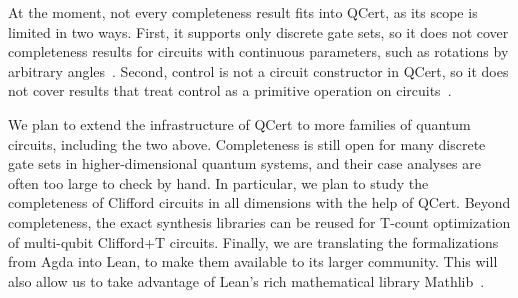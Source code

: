 \documentclass[acmsmall,nonacm,11pt,screen]{acmart}
\begin{document}
At the moment, not every completeness result fits into QCert, as its scope is limited in two ways. First, it supports only discrete gate sets, so it does not cover completeness results for circuits with continuous parameters, such as rotations by arbitrary angles~\cite{clement2023complete,clement2024extensions,clement2024minimal}. Second, control is not a circuit constructor in QCert, so it does not cover results that treat control as a primitive operation on circuits~\cite{delorme2026control,schober2026control,blake2026qudit}.

We plan to extend the infrastructure of QCert to more families of quantum circuits, including the two above. Completeness is still open for many discrete gate sets in higher-dimensional quantum systems, and their case analyses are often too large to check by hand. In particular, we plan to study the completeness of Clifford circuits in all dimensions with the help of QCert. Beyond completeness, the exact synthesis libraries can be reused for T-count optimization of multi-qubit Clifford+T circuits. Finally, we are translating the formalizations from Agda into Lean, to make them available to its larger community. This will also allow us to take advantage of Lean's rich mathematical library Mathlib~\cite{mathlib2020}.



\end{document}
